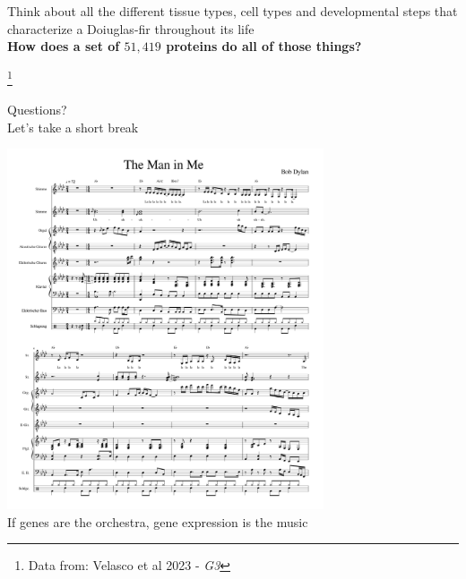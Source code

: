 \documentclass{beamer}
\newcommand\blfootnote[1]{%
	\begingroup
	\renewcommand\thefootnote{}\footnote{#1}%
	\addtocounter{footnote}{-1}%
	\endgroup
}
\begin{document}
\begin{frame}
\pause 
\vspace{20pt}
Think about all the different tissue types, cell types and developmental steps that characterize a Doiuglas-fir throughout its life \\
\vspace{10pt}
\textbf{How does a set of $51,419$ proteins do all of those things?}

	\blfootnote{Data from: Velasco et al 2023 - \textit{G3}}
\end{frame}





\begin{frame}
	
	\Huge
	Questions? \\ \pause
	Let's take a short break
	
\end{frame}


\begin{frame}
		\centering	\includegraphics[keepaspectratio, width  = 0.7\textwidth]{img/bobd}\\ \pause
If genes are the orchestra, gene expression is the music
\end{frame}
\end{document}
